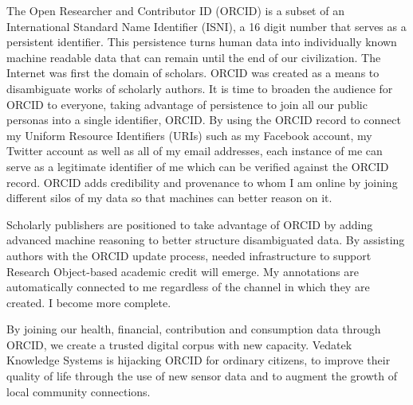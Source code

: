 \documentclass[a4paper,USenglish]{dagrep}
\begin{document}
{}
\license
The Open Researcher and Contributor ID (ORCID) is a subset of an International 
Standard Name Identifier (ISNI), a 16 digit number that serves as a persistent 
identifier.  This persistence turns human data into individually known machine 
readable data that can remain until the end of our civilization.  The Internet was 
first the domain of scholars.  ORCID was created as a means to disambiguate 
works of scholarly authors.  It is time to broaden the audience for ORCID to 
everyone, taking advantage of persistence to join all our public personas into a 
single identifier, ORCID.  By using the ORCID record to connect my Uniform 
Resource Identifiers (URIs) such as my Facebook account, my Twitter account as 
well as all of my email addresses, each instance of me can serve as a legitimate 
identifier of me which can be verified against the ORCID record.  ORCID adds 
credibility and provenance to whom I am online by joining different silos of my 
data so that machines can better reason on it.

Scholarly publishers are positioned to take advantage of ORCID by adding 
advanced machine reasoning to better structure disambiguated data.  By 
assisting authors with the ORCID update process, needed infrastructure to 
support Research Object-based academic credit will emerge.  My annotations are 
automatically connected to me regardless of the channel in which they are 
created.  I become more complete.

By joining our health, financial, contribution and consumption data through 
ORCID, we create a trusted digital corpus with new capacity.  Vedatek Knowledge 
Systems is hijacking ORCID for ordinary citizens, to improve their quality of life 
through the use of new sensor data and to augment the growth of local 
community connections. 

{}
\license
\end{document}
